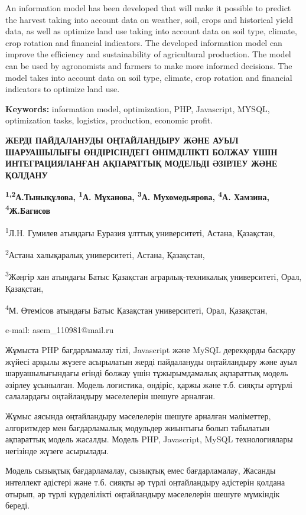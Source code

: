 An information model has been developed that will make it possible to
predict the harvest taking into account data on weather, soil, crops and
historical yield data, as well as optimize land use taking into account
data on soil type, climate, crop rotation and financial indicators. The
developed information model can improve the efficiency and
sustainability of agricultural production. The model can be used by
agronomists and farmers to make more informed decisions. The model takes
into account data on soil type, climate, crop rotation and financial
indicators to optimize land use.

\textbf{Keywords:} information model, optimization, PHP, Javascript,
MYSQL, optimization tasks, logistics, production, economic profit.

\textbf{ЖЕРДІ ПАЙДАЛАНУДЫ ОҢТАЙЛАНДЫРУ ЖӘНЕ АУЫЛ ШАРУАШЫЛЫҒЫ
ӨНДІРІСІНДЕГІ ӨНІМДІЛІКТІ БОЛЖАУ ҮШІН ИНТЕГРАЦИЯЛАНҒАН АҚПАРАТТЫҚ
МОДЕЛЬДІ ӘЗІРЛЕУ ЖӘНЕ ҚОЛДАНУ}

\textbf{\textsuperscript{1,2}А.Тынықұлова, \textsuperscript{1}А.
Мұханова, \textsuperscript{3}А. Мухомедьярова, \textsuperscript{4}А.
Хамзина, \textsuperscript{4}Ж.Багисов}

\textsuperscript{1}Л.Н. Гумилев атындағы Еуразия ұлттық университеті,
Астана, Қазақстан,

\textsuperscript{2}Астана халықаралық университеті, Астана, Қазақстан,

\textsuperscript{3}Жәңгір хан атындағы Батыс Қазақстан
аграрлық-техникалық университеті, Орал, Қазақстан,

\textsuperscript{4}М. Өтемісов атындағы Батыс Қазақстан университеті,
Орал, Қазақстан,

e-mail: asem\_110981@mail.ru

Жұмыста PHP бағдарламалау тілі, Javascript және MySQL дерекқорды басқару
жүйесі арқылы жүзеге асырылатын жерді пайдалануды оңтайландыру және ауыл
шаруашылығындағы егінді болжау үшін тұжырымдамалық ақпараттық модель
әзірлеу ұсынылған. Модель логистика, өндіріс, қаржы және т.б. сияқты
әртүрлі салалардағы оңтайландыру мәселелерін шешуге арналған.

Жұмыс аясында оңтайландыру мәселелерін шешуге арналған мәліметтер,
алгоритмдер мен бағдарламалық модульдер жиынтығы болып табылатын
ақпараттық модель жасалды. Модель PHP, Javascript, MySQL технологиялары
негізінде жүзеге асырылады.

Модель сызықтық бағдарламалау, сызықтық емес бағдарламалау, Жасанды
интеллект әдістері және т.б. сияқты әр түрлі оңтайландыру әдістерін
қолдана отырып, әр түрлі күрделілікті оңтайландыру мәселелерін шешуге
мүмкіндік береді.

